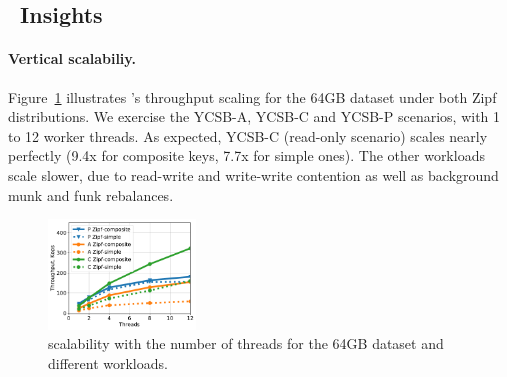 \subsection{\sys\ Insights}
\label{ssec:drill} 

\paragraph{Vertical scalabiliy.} 
Figure~\ref{fig:scalability} illustrates \sys's throughput scaling for the 64GB dataset under both Zipf  
distributions. We exercise the YCSB-A, YCSB-C and YCSB-P scenarios, with 1 to 12 worker threads.  
As expected, YCSB-C (read-only scenario) scales nearly perfectly (9.4x for composite keys, 7.7x for simple ones). 
The other workloads scale slower, due to read-write and write-write contention as well as background munk and funk rebalances. 

\begin{figure}[th]
\centering
\includegraphics[width=0.35\textwidth]{figs/scalability_line.pdf}
\caption{{\sys\/ scalability with the number of threads for 
the 64GB dataset and different workloads. }}
\label{fig:scalability}
\end{figure}

